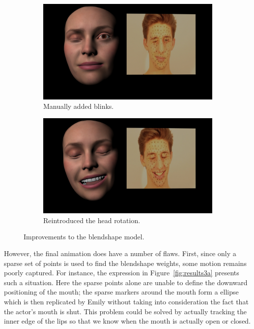 \begin{figure}
        \centering
        \begin{subfigure}[t]{0.5\textwidth}
                \includegraphics[width=\textwidth]{img/results/Emily_Maya_clean_video_775}
                \caption{Manually added blinks.}\label{fig:results2a}
        \end{subfigure}
        \begin{subfigure}[t]{0.5\textwidth}
                \includegraphics[width=\textwidth]{img/results/Emily_Maya_clean_video_2941}
                \caption{Reintroduced the head rotation.}
        \end{subfigure}
        \caption{Improvements to the blendshape model.}\label{fig:results2b}
        \label{fig:results2}
\end{figure}

However, the final animation does have a number of flaws. First, since only a sparse set of points is used to find the blendshape weights, some motion remains poorly captured. For instance, the expression in Figure~\ref{fig:results3a} presents such a situation. Here the sparse points alone are unable to define the downward positioning of the mouth; the sparse markers around the mouth form a ellipse which is then replicated by Emily without taking into consideration the fact that the actor's mouth is shut. This problem could be solved by actually tracking the inner edge of the lips so that we know when the mouth is actually open or closed.

